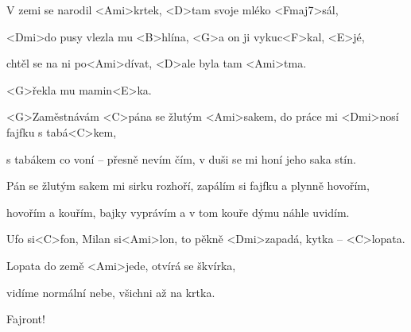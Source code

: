 

\zs
V zemi se narodil <Ami>krtek,
<D>tam svoje mléko <Fmaj7>sál,

<Dmi>do pusy vlezla mu <B>hlína,
<G>a on ji vykuc<F>kal, <E>jé,

chtěl se na {ni} po<Ami>dívat,
<D>ale byla tam <Ami>tma.

<G>řekla mu mamin<E>ka.

\ks
\zs

<G>Zaměstnávám <C>pána se žlutým <Ami>sakem,
do práce mi <Dmi>nosí fajfku s tabá<C>kem,

s tabákem co voní -- přesně nevím čím,
v duši se mi honí jeho saka stín.

Pán se žlutým sakem mi sirku rozhoří,
zapálím si fajfku a plynně hovořím,

hovořím a kouřím, bajky vyprávím
a v tom kouře dýmu náhle uvidím.

\ks
\zs

Ufo si<C>fon, Milan si<Ami>lon,
to pěkně <Dmi>zapadá, kytka -- <C>lopata.

Lopata do země <Ami>jede,
otvírá se škvírka,

vidíme normální nebe,
všichni až na krtka.

Fajront!
\ks

\kp





